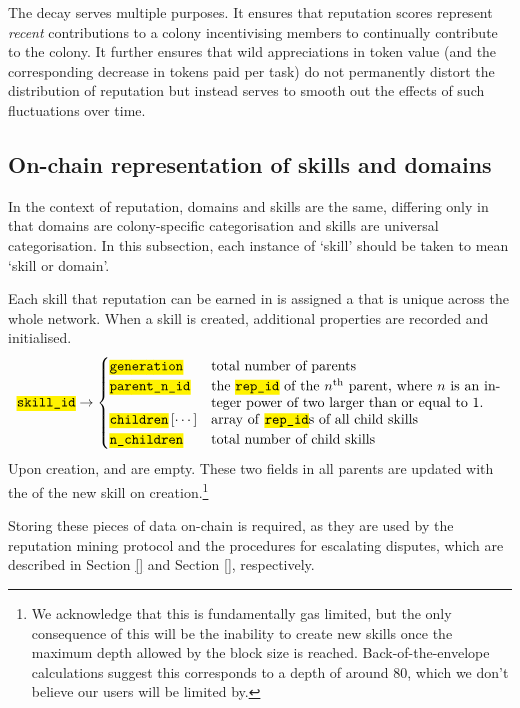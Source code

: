 The decay serves multiple purposes. It ensures that reputation scores represent \emph{recent} contributions to a colony incentivising members to continually contribute to the colony. It further ensures that wild appreciations in token value (and the corresponding decrease in tokens paid per task) do not permanently distort the distribution of reputation but instead serves to smooth out the effects of such fluctuations over time.

\subsection{On-chain representation of skills and domains}\label{subsec:on-chain-representation-of-skills}
In the context of reputation, domains and skills are the same, differing only in that domains are colony-specific categorisation and skills are universal categorisation. In this subsection, each instance of `skill' should be taken to mean `skill or domain'.

Each skill that reputation can be earned in is assigned a  that is unique across the whole network. When a skill is created, additional properties are recorded and initialised.
\begin{equation*}
  \ascode{skill\_id} \rightarrow 
  \begin{cases}
    \ascode{generation} &	\textnormal{total number of parents}\\
    \ascode{parent\_n\_id} &	\parbox[t]{.6\linewidth}{\textnormal{the \ascode{rep\_id} of the $n^{\rm th}$ parent, where $n$ is an integer power of two larger than or equal to 1. }}\\
    \ascode{children}\left[\cdots\right] &	\textnormal{array of \ascode{rep\_id}s of all child skills}\\
    \ascode{n\_children} &	\textnormal{total number of child skills}
  \end{cases}
\end{equation*}
Upon creation,  and  are empty. These two fields in all parents are updated with the  of the new skill on creation.\footnote{We acknowledge that this is fundamentally gas limited, but the only consequence of this will be the inability to create new skills once the maximum depth allowed by the block size is reached. Back-of-the-envelope calculations suggest this corresponds to a depth of around 80, which we don't believe our users will be limited by.}

Storing these pieces of data on-chain is required, as they are used by the reputation mining protocol and the procedures for escalating disputes, which are described in Section \ref{} and Section \ref{}, respectively.

